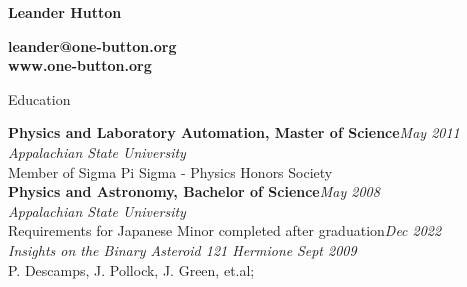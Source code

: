 \documentclass{new_cv} %
\begin{document}
	\begin{multicols}{2}
			{\Huge \bfseries  Leander Hutton}  
			\begin{flushright}
					{\bfseries leander@one-button.org \\ \bfseries www.one-button.org}\\
			\end{flushright}

	     \end{multicols}

\begin{rSection}{Education}
	
	{\bf \color{NavyBlue} Physics and Laboratory Automation, Master of Science}\hfill {\em May 2011} \\ 
	{\em Appalachian State University} \\
	Member of Sigma Pi Sigma - Physics Honors Society \\

	{\bf  \color{NavyBlue} Physics and Astronomy, Bachelor of Science}\hfill {\em May 2008} \\ 
	{\em Appalachian State University} \\
	Requirements for Japanese Minor completed after graduation\hfill{\em Dec 2022}\\
	{\em Insights on the Binary Asteroid 121 Hermione} \hfill {\em Sept 2009}\\ {P. Descamps, J. Pollock, J. Green, et.al;}	
\end{rSection}
\end{document}
